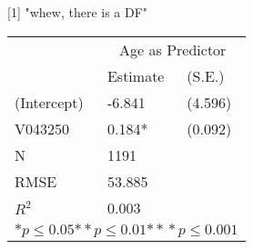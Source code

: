 [1] "whew, there is a DF"
\begin{tabular}{*{3}{l}}
\hline
                  & \multicolumn{2}{c}{Age as Predictor}   \tabularnewline
                   &Estimate  &(S.E.)  \tabularnewline
 \hline
 \hline
   (Intercept)     &-6.841   &   (4.596) \tabularnewline
   V043250         &0.184*   &   (0.092) \tabularnewline
 \hline
 N                 &1191       &        \tabularnewline
 RMSE             &53.885         & \tabularnewline
 $R^2$             &0.003         & \tabularnewline
 \hline
\hline
 
 \multicolumn{3}{c}{${*  p}\le 0.05$${*\!\!*  p}\le 0.01$${*\!\!*\!\!*  p}\le 0.001$}\tabularnewline
 \end{tabular}